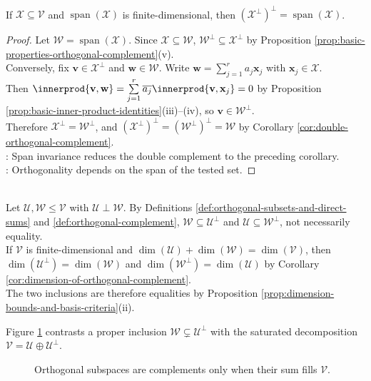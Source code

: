 \begin{corollary} \label{cor:double-orthogonal-complement-of-finite-span} \\
If $\mathcal{X}\subseteq\mathcal{V}$ and $\operatorname{span}(\mathcal{X})$ is finite-dimensional, then $(\mathcal{X}^{\perp})^{\perp}=\operatorname{span}(\mathcal{X})$.
\begin{proof}
Let $\mathcal{W}=\operatorname{span}(\mathcal{X})$. Since $\mathcal{X}\subseteq\mathcal{W}$, $\mathcal{W}^{\perp}\subseteq\mathcal{X}^{\perp}$ by Proposition \ref{prop:basic-properties-orthogonal-complement}(v).\\
Conversely, fix $\mathbf{v}\in\mathcal{X}^{\perp}$ and $\mathbf{w}\in\mathcal{W}$. Write $\mathbf{w}=\sum\limits_{j=1}^{r}a_j\mathbf{x}_j$ with $\mathbf{x}_j\in\mathcal{X}$.\\
Then $\innerprod{\mathbf{v},\mathbf{w}}=\sum\limits_{j=1}^{r}\overline{a_j}\innerprod{\mathbf{v},\mathbf{x}_j}=0$ by Proposition \ref{prop:basic-inner-product-identities}(iii)--(iv), so $\mathbf{v}\in\mathcal{W}^{\perp}$.\\
Therefore $\mathcal{X}^{\perp}=\mathcal{W}^{\perp}$, and $(\mathcal{X}^{\perp})^{\perp}=(\mathcal{W}^{\perp})^{\perp}=\mathcal{W}$ by Corollary \ref{cor:double-orthogonal-complement}.\\
: Span invariance reduces the double complement to the preceding corollary.\\
: Orthogonality depends on the span of the tested set.
\end{proof}
\end{corollary}

\begin{perspective} \label{per:orthogonal-subspaces-versus-complements} \\
Let $\mathcal{U},\mathcal{W}\leq\mathcal{V}$ with $\mathcal{U}\perp\mathcal{W}$. By Definitions \ref{def:orthogonal-subsets-and-direct-sums} and \ref{def:orthogonal-complement}, $\mathcal{W}\subseteq\mathcal{U}^{\perp}$ and $\mathcal{U}\subseteq\mathcal{W}^{\perp}$, not necessarily equality.\\
If $\mathcal{V}$ is finite-dimensional and $\dim(\mathcal{U})+\dim(\mathcal{W})=\dim(\mathcal{V})$, then $\dim(\mathcal{U}^{\perp})=\dim(\mathcal{W})$ and $\dim(\mathcal{W}^{\perp})=\dim(\mathcal{U})$ by Corollary \ref{cor:dimension-of-orthogonal-complement}.\\
The two inclusions are therefore equalities by Proposition \ref{prop:dimension-bounds-and-basis-criteria}(ii).
\end{perspective}

Figure \ref{fig:orthogonal-subspaces-vs-complements} contrasts a proper inclusion $\mathcal{W}\subsetneq\mathcal{U}^{\perp}$ with the saturated decomposition $\mathcal{V}=\mathcal{U}\oplus\mathcal{U}^{\perp}$.

\begin{figure}[H]
  \centering
  
  \caption{Orthogonal subspaces are complements only when their sum fills $\mathcal{V}$.}
  \label{fig:orthogonal-subspaces-vs-complements}
\end{figure}

